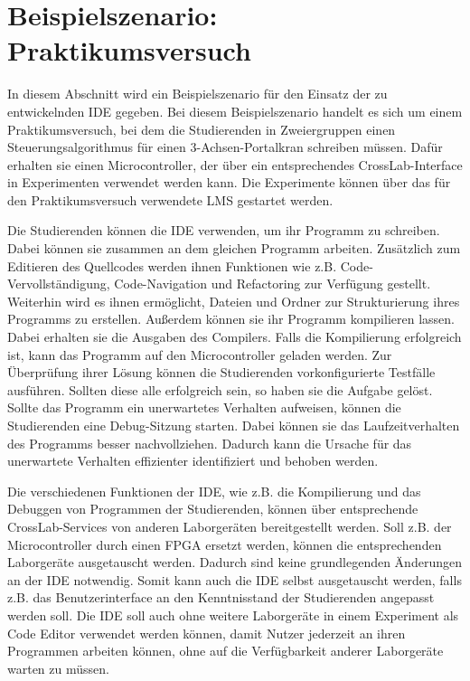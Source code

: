 \section{Beispielszenario: Praktikumsversuch}\label{section:anforderungsanalyse:beispielszenario}

In diesem Abschnitt wird ein Beispielszenario für den Einsatz der zu entwickelnden IDE gegeben. Bei diesem Beispielszenario handelt es sich um einem Praktikumsversuch, bei dem die Studierenden in Zweiergruppen einen Steuerungsalgorithmus für einen 3-Achsen-Portalkran schreiben müssen. Dafür erhalten sie einen Microcontroller, der über ein entsprechendes CrossLab-Interface in Experimenten verwendet werden kann. Die Experimente können über das für den Praktikumsversuch verwendete \ac{LMS} gestartet werden.

Die Studierenden können die IDE verwenden, um ihr Programm zu schreiben. Dabei können sie zusammen an dem gleichen Programm arbeiten. Zusätzlich zum Editieren des Quellcodes werden ihnen Funktionen wie z.B. Code-Vervollständigung, Code-Navigation und Refactoring zur Verfügung gestellt. Weiterhin wird es ihnen ermöglicht, Dateien und Ordner zur Strukturierung ihres Programms zu erstellen. Außerdem können sie ihr Programm kompilieren lassen. Dabei erhalten sie die Ausgaben des Compilers. Falls die Kompilierung erfolgreich ist, kann das Programm auf den Microcontroller geladen werden. Zur Überprüfung ihrer Lösung können die Studierenden vorkonfigurierte Testfälle ausführen. Sollten diese alle erfolgreich sein, so haben sie die Aufgabe gelöst. Sollte das Programm ein unerwartetes Verhalten aufweisen, können die Studierenden eine Debug-Sitzung starten. Dabei können sie das Laufzeitverhalten des Programms besser nachvollziehen. Dadurch kann die Ursache für das unerwartete Verhalten effizienter identifiziert und behoben werden.

Die verschiedenen Funktionen der IDE, wie z.B. die Kompilierung und das Debuggen von Programmen der Studierenden, können über entsprechende CrossLab-Services von anderen Laborgeräten bereitgestellt werden. Soll z.B. der Microcontroller durch einen FPGA ersetzt werden, können die entsprechenden Laborgeräte ausgetauscht werden. Dadurch sind keine grundlegenden Änderungen an der IDE notwendig. Somit kann auch die IDE selbst ausgetauscht werden, falls z.B. das Benutzerinterface an den Kenntnisstand der Studierenden angepasst werden soll. Die IDE soll auch ohne weitere Laborgeräte in einem Experiment als Code Editor verwendet werden können, damit Nutzer jederzeit an ihren Programmen arbeiten können, ohne auf die Verfügbarkeit anderer Laborgeräte warten zu müssen.
